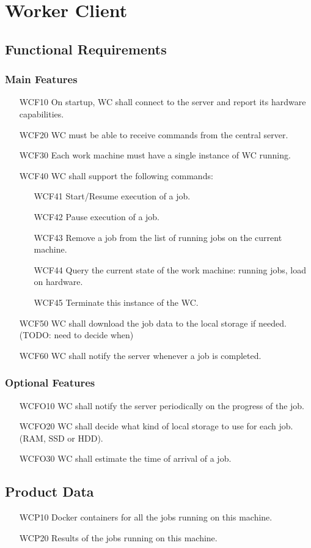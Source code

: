 \chapter{Worker Client}
  \section{Functional Requirements}
    \subsection{Main Features}
    \begin{enumerate}
      \item[WCF10] On startup, WC shall connect to the server and report its hardware capabilities.
      \item[WCF20] WC must be able to receive commands from the central server.
      \item[WCF30] Each work machine must have a single instance of WC running.
      \item[WCF40] WC shall support the following commands:
      \begin{enumerate}
        \item[WCF41] Start/Resume execution of a job.
        \item[WCF42] Pause execution of a job.
        \item[WCF43] Remove a job from the list of running jobs on the current machine.
        \item[WCF44] Query the current state of the work machine: running jobs, load on hardware.
        \item[WCF45] Terminate this instance of the WC.
      \end{enumerate}
      \item[WCF50] WC shall download the job data to the local storage if needed. (TODO: need to decide when)
      \item[WCF60] WC shall notify the server whenever a job is completed.
    \end{enumerate}

    \subsection{Optional Features}
      \begin{enumerate}
        \item[WCFO10] WC shall notify the server periodically on the progress of the job.
        \item[WCFO20] WC shall decide what kind of local storage to use for each job. (RAM, SSD or HDD).
        \item[WCFO30] WC shall estimate the time of arrival of a job.
      \end{enumerate}

  \section{Product Data}
  \begin{enumerate}
    \item[WCP10] Docker containers for all the jobs running on this machine.
    \item[WCP20] Results of the jobs running on this machine.
  \end{enumerate}
